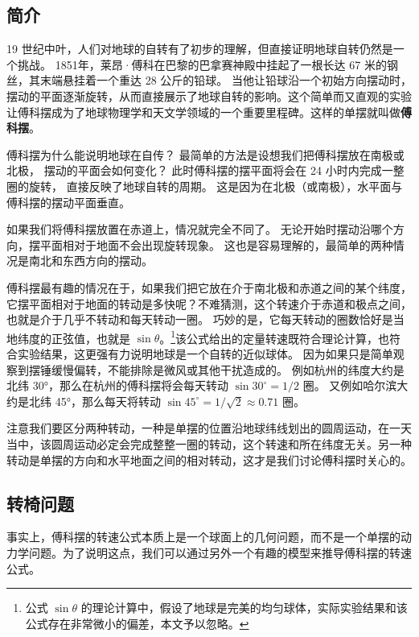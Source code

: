 
\begin{issues}
\end{issues}

\subsection{简介}
19 世纪中叶，人们对地球的自转有了初步的理解，但直接证明地球自转仍然是一个挑战。 1851年，莱昂·傅科在巴黎的巴拿赛神殿中挂起了一根长达 67 米的钢丝，其末端悬挂着一个重达 28 公斤的铅球。 当他让铅球沿一个初始方向摆动时，摆动的平面逐渐旋转，从而直接展示了地球自转的影响。这个简单而又直观的实验让傅科摆成为了地球物理学和天文学领域的一个重要里程碑。这样的单摆就叫做\textbf{傅科摆}。

傅科摆为什么能说明地球在自传？ 最简单的方法是设想我们把傅科摆放在南极或北极， 摆动的平面会如何变化？ 此时傅科摆的摆平面将会在 24 小时内完成一整圈的旋转， 直接反映了地球自转的周期。 这是因为在北极（或南极），水平面与傅科摆的摆动平面垂直。

如果我们将傅科摆放置在赤道上，情况就完全不同了。 无论开始时摆动沿哪个方向，摆平面相对于地面不会出现旋转现象。 这也是容易理解的，最简单的两种情况是南北和东西方向的摆动。

傅科摆最有趣的情况在于，如果我们把它放在介于南北极和赤道之间的某个纬度，它摆平面相对于地面的转动是多快呢？不难猜测，这个转速介于赤道和极点之间，也就是介于几乎不转动和每天转动一圈。 巧妙的是，它每天转动的圈数恰好是当地纬度的正弦值，也就是 $\sin\theta$。\footnote{公式 $\sin\theta$ 的理论计算中，假设了地球是完美的均匀球体，实际实验结果和该公式存在非常微小的偏差，本文予以忽略。}该公式给出的定量转速既符合理论计算，也符合实验结果，这更强有力说明地球是一个自转的近似球体。 因为如果只是简单观察到摆锤缓慢偏转，不能排除是微风或其他干扰造成的。 例如杭州的纬度大约是北纬 30°，那么在杭州的傅科摆将会每天转动 $\sin 30^\circ = 1/2$ 圈。 又例如哈尔滨大约是北纬 45°，那么每天将转动 $\sin 45^\circ = 1/\sqrt{2}\approx 0.71$ 圈。

注意我们要区分两种转动，一种是单摆的位置沿地球纬线划出的圆周运动，在一天当中，该圆周运动必定会完成整整一圈的转动，这个转速和所在纬度无关。另一种转动是单摆的方向和水平地面之间的相对转动，这才是我们讨论傅科摆时关心的。

\subsection{转椅问题}
事实上，傅科摆的转速公式本质上是一个球面上的几何问题，而不是一个单摆的动力学问题。为了说明这点，我们可以通过另外一个有趣的模型来推导傅科摆的转速公式。

